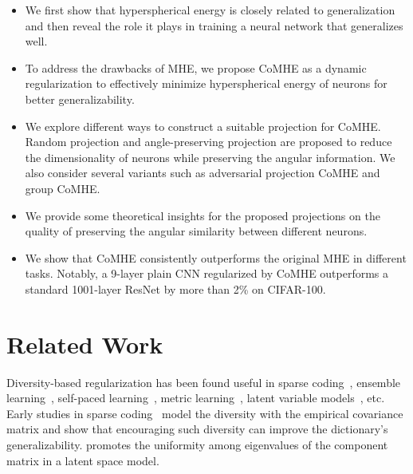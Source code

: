 \begin{itemize}[leftmargin=*,nosep,nolistsep]
    \item We first show that hyperspherical energy is closely related to generalization and then reveal the role it plays in training a neural network that generalizes well.
    \item To address the drawbacks of MHE, we propose CoMHE as a dynamic regularization to effectively minimize hyperspherical energy of neurons for better generalizability.
    \item We explore different ways to construct a suitable projection for CoMHE. Random projection and angle-preserving projection are proposed to reduce the dimensionality of neurons while preserving the angular information. We also consider several variants such as adversarial projection CoMHE and group CoMHE.
    \item We provide some theoretical insights for the proposed projections on the quality of preserving the angular similarity between different neurons.
    \item We show that CoMHE consistently outperforms the original MHE in different tasks. Notably, a 9-layer plain CNN regularized by CoMHE outperforms a standard 1001-layer ResNet by more than 2\% on CIFAR-100.
\end{itemize}

\section{Related Work}

Diversity-based regularization has been found useful in sparse coding~\cite{mairal2009online,ramirez2010classification}, ensemble learning~\cite{li2012diversity,kuncheva2003measures}, self-paced learning~\cite{jiang2014self}, metric learning~\cite{xie2018orthogonality}, latent variable models~\cite{xie2016diversity}, etc. Early studies in sparse coding~\cite{mairal2009online,ramirez2010classification} model the diversity with the empirical covariance matrix and show that encouraging such diversity can improve the dictionary's generalizability. \cite{xie2017uncorrelation} promotes the uniformity among eigenvalues of the component matrix in a latent space model. 

